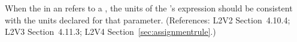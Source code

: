 When the  in an \InitialAssignment refers to a \Parameter,
the units of the \InitialAssignment's  expression should be
consistent with the units declared for that parameter.  (References: L2V2
Section~4.10.4; L2V3 Section~4.11.3; L2V4 Section~\ref{sec:assignmentrule}.)
